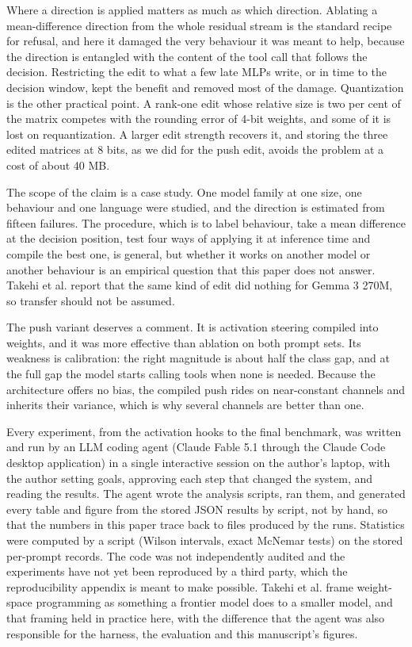 \documentclass[11pt]{article}
\begin{document}
Where a direction is applied matters as much as which direction. Ablating a mean-difference direction from the whole residual stream is the standard recipe for refusal, and here it damaged the very behaviour it was meant to help, because the direction is entangled with the content of the tool call that follows the decision. Restricting the edit to what a few late MLPs write, or in time to the decision window, kept the benefit and removed most of the damage. Quantization is the other practical point. A rank-one edit whose relative size is two per cent of the matrix competes with the rounding error of 4-bit weights, and some of it is lost on requantization. A larger edit strength recovers it, and storing the three edited matrices at 8 bits, as we did for the push edit, avoids the problem at a cost of about 40 MB.

The scope of the claim is a case study. One model family at one size, one behaviour and one language were studied, and the direction is estimated from fifteen failures. The procedure, which is to label behaviour, take a mean difference at the decision position, test four ways of applying it at inference time and compile the best one, is general, but whether it works on another model or another behaviour is an empirical question that this paper does not answer. Takehi et al. report that the same kind of edit did nothing for Gemma 3 270M, so transfer should not be assumed.

The push variant deserves a comment. It is activation steering compiled into weights, and it was more effective than ablation on both prompt sets. Its weakness is calibration: the right magnitude is about half the class gap, and at the full gap the model starts calling tools when none is needed. Because the architecture offers no bias, the compiled push rides on near-constant channels and inherits their variance, which is why several channels are better than one.

Every experiment, from the activation hooks to the final benchmark, was written and run by an LLM coding agent (Claude Fable 5.1 through the Claude Code desktop application) in a single interactive session on the author's laptop, with the author setting goals, approving each step that changed the system, and reading the results. The agent wrote the analysis scripts, ran them, and generated every table and figure from the stored JSON results by script, not by hand, so that the numbers in this paper trace back to files produced by the runs. Statistics were computed by a script (Wilson intervals, exact McNemar tests) on the stored per-prompt records. The code was not independently audited and the experiments have not yet been reproduced by a third party, which the reproducibility appendix is meant to make possible. Takehi et al. frame weight-space programming as something a frontier model does to a smaller model, and that framing held in practice here, with the difference that the agent was also responsible for the harness, the evaluation and this manuscript's figures.
\end{document}
